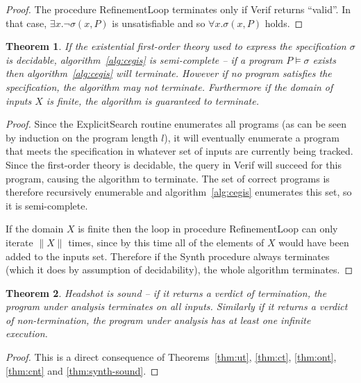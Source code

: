 \documentclass[preprint]{sigplanconf}
\newtheorem{theorem}{Theorem}
\theoremstyle{definition}
\begin{document}
\begin{proof}
 The procedure {\sc RefinementLoop} terminates only if {\sc Verif} returns ``valid''.  In that
 case, $\exists x . \lnot \sigma(x, P)$ is unsatisfiable and so $\forall x . \sigma(x, P)$ holds.
\end{proof}

\begin{theorem}
 \label{thm:synth-semicomplete}
 If the existential first-order theory used to express the specification $\sigma$ is decidable,
 algorithm~\ref{alg:cegis} is semi-complete -- if a program $P \models \sigma$
 exists then algorithm~\ref{alg:cegis} will terminate.  However if no program
 satisfies the specification, the algorithm may not terminate.  Furthermore if the domain of inputs $X$
 is finite, the algorithm is guaranteed to terminate.
\end{theorem}

\begin{proof}
 Since the {\sc ExplicitSearch} routine enumerates all programs (as can be seen by induction on
 the program length $l$), it will eventually enumerate a program that meets the specification
 in whatever set of inputs are currently being tracked.  Since the first-order theory is
 decidable, the query in {\sc Verif} will succeed for this program, causing the algorithm to terminate.
 The set of correct programs is therefore recursively enumerable and algorithm~\ref{alg:cegis}
 enumerates this set, so it is semi-complete.

 If the domain $X$ is finite then the loop in procedure {\sc RefinementLoop} can only
 iterate $\| X \|$ times, since by this time all of the elements of $X$ would have been
 added to the inputs set.  Therefore if the {\sc Synth} procedure always terminates (which it does
 by assumption of decidability), the whole algorithm terminates.
\end{proof}


\begin{theorem}
\label{thm:sound}
 {\sc Headshot} is sound -- if it returns a verdict of termination, the program under
 analysis terminates on all inputs.  Similarly if it returns a verdict of non-termination,
 the program under analysis has at least one infinite execution.
\end{theorem}

\begin{proof}
 This is a direct consequence of Theorems~\ref{thm:ut}, \ref{thm:ct}, \ref{thm:ont}, \ref{thm:cnt} and \ref{thm:synth-sound}.
\end{proof}
\end{document}
